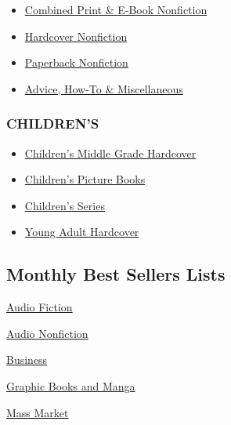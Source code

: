 \begin{itemize}
\tightlist
\item
  \href{/books/best-sellers/2020/08/02/combined-print-and-e-book-nonfiction/}{Combined
  Print \& E-Book Nonfiction}
\item
  \href{/books/best-sellers/2020/08/02/hardcover-nonfiction/}{Hardcover
  Nonfiction}
\item
  \href{/books/best-sellers/2020/08/02/paperback-nonfiction/}{Paperback
  Nonfiction}
\item
  \href{/books/best-sellers/2020/08/02/advice-how-to-and-miscellaneous/}{Advice,
  How-To \& Miscellaneous}
\end{itemize}

\hypertarget{childrens}{%
\subsubsection{CHILDREN'S}\label{childrens}}

\begin{itemize}
\tightlist
\item
  \href{/books/best-sellers/2020/08/02/childrens-middle-grade-hardcover/}{Children's
  Middle Grade Hardcover}
\item
  \href{/books/best-sellers/2020/08/02/picture-books/}{Children's
  Picture Books}
\item
  \href{/books/best-sellers/2020/08/02/series-books/}{Children's Series}
\item
  \href{/books/best-sellers/2020/08/02/young-adult-hardcover/}{Young
  Adult Hardcover}
\end{itemize}

\hypertarget{monthly-best-sellers-lists}{%
\subsection{Monthly Best Sellers
Lists}\label{monthly-best-sellers-lists}}

\href{/books/best-sellers/2020/08/02/audio-fiction/}{Audio Fiction}

\href{/books/best-sellers/2020/08/02/audio-nonfiction/}{Audio
Nonfiction}

\href{/books/best-sellers/2020/08/02/business-books/}{Business}

\href{/books/best-sellers/2020/08/02/graphic-books-and-manga/}{Graphic
Books and Manga}

\href{/books/best-sellers/2020/08/02/mass-market-monthly/}{Mass Market}


